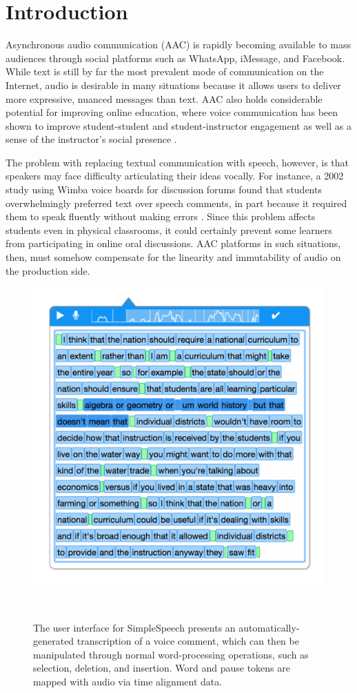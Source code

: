 \section{Introduction}

Asynchronous audio communication (AAC) is rapidly becoming available to mass audiences through social platforms such as WhatsApp, iMessage, and Facebook. 
While text is still by far the most prevalent mode of communication on the Internet, audio is desirable in many situations because it allows users to deliver more expressive, nuanced messages than text.
AAC also holds considerable potential for improving online education, where voice communication has been shown to improve student-student and student-instructor engagement as well as a sense of the instructor's social presence \cite{ice,oomen,tu}. 

The problem with replacing textual communication with speech, however, is that speakers may face difficulty articulating their ideas vocally.
For instance, a 2002 study using Wimba voice boards for discussion forums found that students overwhelmingly preferred text over speech comments, in part because it required them to speak fluently without making errors \cite{wimba}.
Since this problem affects students even in physical classrooms, it could certainly prevent some learners from participating in online oral discussions.
AAC platforms in such situations, then, must somehow compensate for the linearity and immutability of audio on the production side.

\begin{figure}
	\centering
	\includegraphics[width=\columnwidth,keepaspectratio]{figures/large_screenshot}
	\caption{The user interface for SimpleSpeech presents an automatically-generated transcription of a voice comment, which can then be manipulated through normal word-processing operations, such as selection, deletion, and insertion. Word and pause tokens are mapped with audio via time alignment data.}~\label{fig:overview_shot}
\end{figure}

